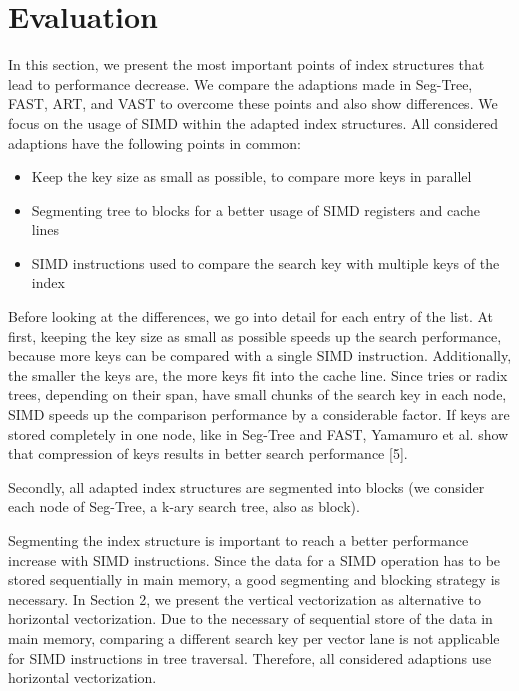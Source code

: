 \documentclass[conference]{IEEEtran}
\begin{document}
\section{Evaluation}
In this section, we present the most important points of index structures that lead to performance decrease. We compare the adaptions made in Seg-Tree, FAST, ART, and VAST to overcome these points and also show differences. We focus on the usage of SIMD within the adapted index structures. 
All considered adaptions have the following points in common:
\begin{itemize}
	\item Keep the key size as small as possible, to compare more keys in parallel
	\item Segmenting tree to blocks for a better usage of SIMD registers and cache lines
	\item SIMD instructions used to compare the search key with multiple keys of the index
\end{itemize}

Before looking at the differences, we go into detail for each entry of the list. At first, keeping the key size as small as possible speeds up the search performance, because more keys can be compared with a single SIMD instruction. Additionally, the smaller the keys are, the more keys fit into the cache line. Since tries or radix trees, depending on their span, have small chunks of the search key in each node, SIMD speeds up the comparison performance by a considerable factor. If keys are stored completely in one node, like in Seg-Tree and FAST, Yamamuro et al. show that compression of keys results in better search performance [5].

Secondly, all adapted index structures are segmented into blocks (we consider each node of Seg-Tree, a k-ary search tree, also as block). 

Segmenting the index structure is important to reach a better performance increase with SIMD instructions. Since the data for a SIMD operation has to be stored sequentially in main memory, a good segmenting and blocking strategy is necessary. In Section 2, we present the vertical vectorization as alternative to horizontal vectorization. Due to the necessary of sequential store of the data in main memory, comparing a different search key per vector lane is not applicable for SIMD instructions in tree traversal. Therefore, all considered adaptions use horizontal vectorization. 
\end{document}
